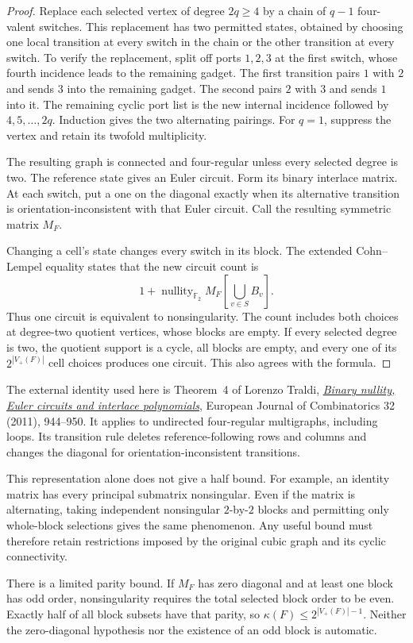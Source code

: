 \begin{proof}
Replace each selected vertex of degree $2q\ge4$ by a chain of $q-1$ four-valent switches.
This replacement has two permitted states, obtained by choosing one local transition at every switch in the chain or the other transition at every switch.
To verify the replacement, split off ports $1,2,3$ at the first switch, whose fourth incidence leads to the remaining gadget.
The first transition pairs $1$ with $2$ and sends $3$ into the remaining gadget.
The second pairs $2$ with $3$ and sends $1$ into it.
The remaining cyclic port list is the new internal incidence followed by $4,5,\ldots,2q$.
Induction gives the two alternating pairings.
For $q=1$, suppress the vertex and retain its twofold multiplicity.

The resulting graph is connected and four-regular unless every selected degree is two.
The reference state gives an Euler circuit.
Form its binary interlace matrix.
At each switch, put a one on the diagonal exactly when its alternative transition is orientation-inconsistent with that Euler circuit.
Call the resulting symmetric matrix $M_F$.

Changing a cell's state changes every switch in its block.
The extended Cohn--Lempel equality states that the new circuit count is
\[
 1+\operatorname{nullity}_{\mathbb F_2}
 M_F\!\left[\bigcup_{v\in S}B_v\right].
\]
Thus one circuit is equivalent to nonsingularity.
The count includes both choices at degree-two quotient vertices, whose blocks are empty.
If every selected degree is two, the quotient support is a cycle, all blocks are empty, and every one of its $2^{|V_+(F)|}$ cell choices produces one circuit.
This also agrees with the formula.
\end{proof}

The external identity used here is Theorem~4 of Lorenzo Traldi,
\href{https://arxiv.org/pdf/0903.4405}{\emph{Binary nullity, Euler circuits and interlace polynomials}},
European Journal of Combinatorics 32 (2011), 944--950.
It applies to undirected four-regular multigraphs, including loops.
Its transition rule deletes reference-following rows and columns and changes the diagonal for orientation-inconsistent transitions.

This representation alone does not give a half bound.
For example, an identity matrix has every principal submatrix nonsingular.
Even if the matrix is alternating, taking independent nonsingular $2$-by-$2$ blocks and permitting only whole-block selections gives the same phenomenon.
Any useful bound must therefore retain restrictions imposed by the original cubic graph and its cyclic connectivity.

There is a limited parity bound.
If $M_F$ has zero diagonal and at least one block has odd order, nonsingularity requires the total selected block order to be even.
Exactly half of all block subsets have that parity, so $\kappa(F)\le2^{|V_+(F)|-1}$.
Neither the zero-diagonal hypothesis nor the existence of an odd block is automatic.
